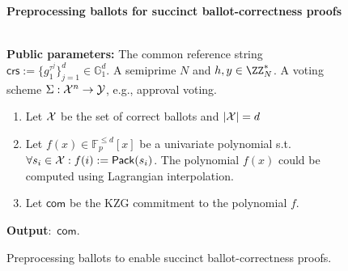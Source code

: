 \begin{figure}
    \centering
    \begin{mdframed}
    \begin{center}
        \textbf{Preprocessing ballots for succinct ballot-correctness proofs}
    \end{center}
    \hfill\\
    \textbf{Public parameters:} The common reference string $\mathsf{crs}:=\{g_1^{\tau^{j}}\}^{d}_{j=1}\in\mathbb{G}_1^{d}$. A semiprime $N$ and $h, y \in \ZZ_N^*$. A voting scheme $\Sigma : \mathcal{X}^n \rightarrow \mathcal{Y}$, e.g., approval voting. \hfill\\
    \begin{enumerate}
        \item Let $\mathcal{X}$ be the set of correct ballots and $\vert\mathcal{X}\vert=d$
        \item Let $f(x)\in\mathbb{F}^{\leq d}_p[x]$ be a univariate polynomial s.t. $\forall s_i\in\mathcal{X}:f(i):=\mathsf{Pack}(s_i)$. The polynomial $f(x)$ could be computed using Lagrangian interpolation.
        \item Let $\mathsf{com}$ be the KZG commitment to the polynomial $f$.
    \end{enumerate}
    \textbf{Output}:~$\mathsf{com}$.
    
    \end{mdframed}
    \caption{Preprocessing ballots to enable succinct ballot-correctness proofs.}
    \label{fig:preprocessing_ballots}
\end{figure}
